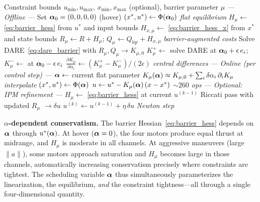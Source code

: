 \begin{algorithm}[t]
\caption{Barrier-Augmented Template MPC}
\label{alg:barrier}
\begin{algorithmic}[1]
\REQUIRE Constraint bounds $u_{\min}, u_{\max}$,
  $x_{\min}, x_{\max}$ (optional),
  barrier parameter $\mu$
\STATE \textit{--- Offline ---}
\STATE Set $\bm{\alpha}_0 = (0,0,0,0)$ (hover)
\STATE $(x^*, u^*) \gets \Phi(\bm{\alpha}_0)$
  \hfill\textit{flat equilibrium}
\STATE $H_\mu \gets$ \eqref{eq:barrier_hess}
  from $u^*$ and input bounds
\STATE $H_{x,\mu} \gets$ \eqref{eq:barrier_hess_x}
  from $x^*$ and state bounds
\STATE $R_\mu \gets R + H_\mu$;
  $Q_\mu \gets Q_{\mathrm{lqr}} + H_{x,\mu}$
  \hfill\textit{barrier-augmented costs}
\STATE Solve DARE~\eqref{eq:dare_barrier}
  with $R_\mu, Q_\mu \to K_{\mu,0}$
  \STATE $K_\mu^+ \gets$ solve DARE at
    $\bm{\alpha}_0 + \epsilon \, e_i$;
    $K_\mu^- \gets$ at $\bm{\alpha}_0 - \epsilon \, e_i$
  \STATE $\frac{\partial K_\mu}{\partial \alpha_i}
    \gets (K_\mu^+ - K_\mu^-) / (2\epsilon)$
    \hfill\textit{central differences}
\ENDFOR
\STATE \textit{--- Online (per control step) ---}
\STATE $\bm{\alpha} \gets$ current flat parameter
\STATE $K_\mu(\bm{\alpha}) \approx K_{\mu,0}
  + \sum_i \delta\alpha_i \,
  \partial_i K_\mu$
  \hfill\textit{interpolate}
\STATE $(x^*, u^*) \gets \Phi(\bm{\alpha})$
\STATE $u \gets u^* - K_\mu(\bm{\alpha}) \, (x - x^*)$
  \hfill\textit{${\sim}260$ ops}
\STATE \textit{--- Optional: IPM refinement ---}
  \STATE $H_\mu \gets$ \eqref{eq:barrier_hess}
    at current $u^{(k-1)}$
  \STATE Riccati pass with updated $R_\mu$
    $\to \delta u$
  \STATE $u^{(k)} \gets u^{(k-1)} + \eta \, \delta u$
    \hfill\textit{Newton step}
\ENDFOR
\end{algorithmic}
\end{algorithm}

\textbf{$\alpha$-dependent conservatism.}
The barrier Hessian~\eqref{eq:barrier_hess} depends on
$\bm{\alpha}$ through $u^*(\bm{\alpha})$.
At hover ($\bm{\alpha} = 0$), the four motors produce equal
thrust at midrange, and $H_\mu$ is moderate in all channels.
At aggressive maneuvers (large $\|a\|$), some motors approach
saturation and $H_\mu$ becomes large in those channels,
automatically increasing conservatism precisely where
constraints are tightest.
The scheduling variable $\bm{\alpha}$ thus simultaneously
parameterizes the linearization, the equilibrium,
\emph{and} the constraint tightness---all through a single
four-dimensional quantity.

